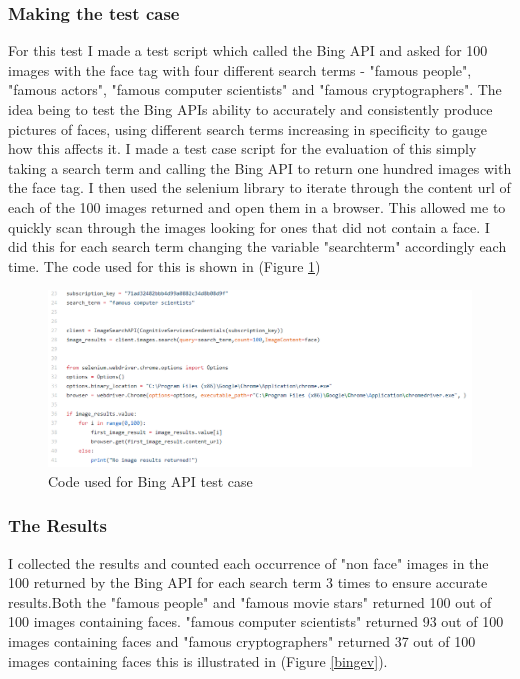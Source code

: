 \documentclass[12pt,a4paper]{article}
\begin{document}
\subsubsection{Making the test case}
For this test I made a test script which called the Bing API and asked for 100 images with the face tag with four different search terms - "famous people", "famous actors", "famous computer scientists" and "famous cryptographers". The idea being to test the Bing APIs ability to accurately and consistently produce pictures of faces, using different search terms increasing in specificity to gauge how this affects it. I made a test case script for the evaluation of this simply taking a search term and calling the Bing API to return one hundred images with the face tag. I then used the selenium library to iterate through the content url of each of the 100 images returned and open them in a browser. This allowed me to quickly scan through the images looking for ones that did not contain a face. I did this for each search term changing the variable "search\textunderscore term" accordingly each time. The code used for this is shown in (Figure \ref{bingevc})  

\begin{figure}[h]
    \centering
    \includegraphics[width=1.0\textwidth]{Figs/bingevcode.PNG} 
    \caption{Code used for Bing API test case} 
    \label{bingevc}
\end{figure} 

\subsubsection{The Results} 

I collected the results and counted each occurrence of "non face" images in the 100 returned by the Bing API for each search term 3 times to ensure accurate results.Both the "famous people" and "famous movie stars" returned 100 out of 100 images containing faces. "famous computer scientists" returned 93 out of 100 images containing faces and "famous cryptographers" returned 37 out of 100 images containing faces this is illustrated in (Figure \ref{bingev}). 
\end{document}

